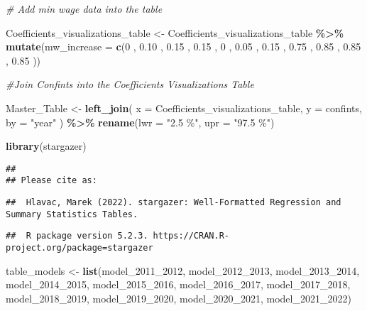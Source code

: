 \documentclass[
]{article}
\newenvironment{Shaded}{\begin{snugshade}}{\end{snugshade}}
\newcommand{\AttributeTok}[1]{\textcolor[rgb]{0.13,0.29,0.53}{#1}}
\newcommand{\CommentTok}[1]{\textcolor[rgb]{0.56,0.35,0.01}{\textit{#1}}}
\newcommand{\DecValTok}[1]{\textcolor[rgb]{0.00,0.00,0.81}{#1}}
\newcommand{\FloatTok}[1]{\textcolor[rgb]{0.00,0.00,0.81}{#1}}
\newcommand{\FunctionTok}[1]{\textcolor[rgb]{0.13,0.29,0.53}{\textbf{#1}}}
\newcommand{\NormalTok}[1]{#1}
\newcommand{\OtherTok}[1]{\textcolor[rgb]{0.56,0.35,0.01}{#1}}
\newcommand{\SpecialCharTok}[1]{\textcolor[rgb]{0.81,0.36,0.00}{\textbf{#1}}}
\newcommand{\StringTok}[1]{\textcolor[rgb]{0.31,0.60,0.02}{#1}}
\begin{document}
\begin{Shaded}
\begin{Highlighting}[]
\CommentTok{\# Add min wage data into the table}

\NormalTok{Coefficients\_visualizations\_table }\OtherTok{\textless{}{-}}\NormalTok{ Coefficients\_visualizations\_table }\SpecialCharTok{\%\textgreater{}\%}
  \FunctionTok{mutate}\NormalTok{(}\AttributeTok{mw\_increase =} \FunctionTok{c}\NormalTok{(}\DecValTok{0}\NormalTok{ , }\FloatTok{0.10}\NormalTok{ , }\FloatTok{0.15}\NormalTok{ , }\FloatTok{0.15}\NormalTok{ , }\DecValTok{0}\NormalTok{ , }\FloatTok{0.05}\NormalTok{ , }\FloatTok{0.15}\NormalTok{ , }\FloatTok{0.75}\NormalTok{ , }\FloatTok{0.85}\NormalTok{ , }\FloatTok{0.85}\NormalTok{ , }\FloatTok{0.85}\NormalTok{ ))}

\CommentTok{\#Join Confints into the Coefficients Visualizations Table}

\NormalTok{Master\_Table }\OtherTok{\textless{}{-}} \FunctionTok{left\_join}\NormalTok{(}
\AttributeTok{x =}\NormalTok{ Coefficients\_visualizations\_table, }
\AttributeTok{y =}\NormalTok{ confints, }
\AttributeTok{by =} \StringTok{"year"}
\NormalTok{) }\SpecialCharTok{\%\textgreater{}\%}
  \FunctionTok{rename}\NormalTok{(}\AttributeTok{lwr =} \StringTok{"2.5 \%"}\NormalTok{, }\AttributeTok{upr =} \StringTok{"97.5 \%"}\NormalTok{)}
\end{Highlighting}
\end{Shaded}

\begin{Shaded}
\begin{Highlighting}[]
\FunctionTok{library}\NormalTok{(stargazer)}
\end{Highlighting}
\end{Shaded}

\begin{verbatim}
## 
## Please cite as:
\end{verbatim}

\begin{verbatim}
##  Hlavac, Marek (2022). stargazer: Well-Formatted Regression and Summary Statistics Tables.
\end{verbatim}

\begin{verbatim}
##  R package version 5.2.3. https://CRAN.R-project.org/package=stargazer
\end{verbatim}

\begin{Shaded}
\begin{Highlighting}[]
\NormalTok{table\_models }\OtherTok{\textless{}{-}} \FunctionTok{list}\NormalTok{(model\_2011\_2012, model\_2012\_2013, model\_2013\_2014, model\_2014\_2015, model\_2015\_2016, model\_2016\_2017, model\_2017\_2018, model\_2018\_2019, model\_2019\_2020, model\_2020\_2021, model\_2021\_2022)}
\end{Highlighting}
\end{Shaded}
\end{document}
